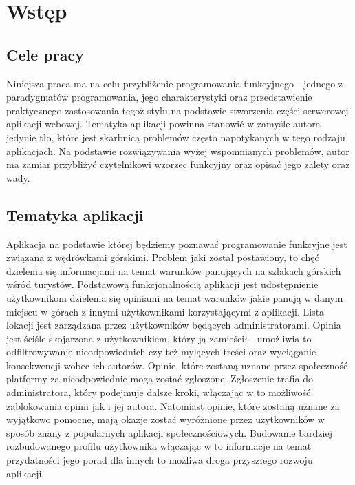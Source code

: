 \documentclass[../main.tex]{subfiles}
\begin{document}
\section{Wstęp}
\subsection{Cele pracy}

Niniejsza praca ma na celu przybliżenie programowania funkcyjnego - jednego z paradygmatów programowania, jego charakterystyki oraz przedstawienie praktycznego zastosowania tegoż stylu na podstawie stworzenia części serwerowej aplikacji webowej. Tematyka aplikacji powinna stanowić w zamyśle autora jedynie tło, które jest skarbnicą problemów często napotykanych w tego rodzaju aplikacjach. Na podstawie rozwiązywania wyżej wspomnianych problemów, autor ma zamiar przybliżyć czytelnikowi wzorzec funkcyjny oraz opisać jego zalety oraz wady.

\subsection{Tematyka aplikacji}
Aplikacja na podstawie której będziemy poznawać programowanie funkcyjne jest związana z wędrówkami górskimi. Problem jaki został postawiony, to chęć dzielenia się informacjami na temat warunków panujących na szlakach górskich wśród turystów. 
Podstawową funkcjonalnością aplikacji jest udostępnienie użytkownikom dzielenia się opiniami na temat warunków jakie panują w danym miejscu w górach z innymi użytkownikami korzystającymi z aplikacji. Lista lokacji jest zarządzana przez użytkowników będących administratorami.\newline
Opinia jest ściśle skojarzona z użytkownikiem, który ją zamieścił - umożliwia to odfiltrowywanie nieodpowiednich czy też mylących treści oraz wyciąganie konsekwencji wobec ich autorów.\newline
Opinie, które zostaną uznane przez społeczność platformy za nieodpowiednie mogą zostać zgłoszone. Zgłoszenie trafia do administratora, który podejmuje dalsze kroki, włączając w to możliwość zablokowania opinii jak i jej autora.\newline
Natomiast opinie, które zostaną uznane za wyjątkowo pomocne, mają okazje zostać wyróżnione przez użytkowników w sposób znany z popularnych aplikacji społecznościowych. Budowanie bardziej rozbudowanego profilu użytkownika włączając w to informacje na temat przydatności jego porad dla innych to możliwa droga przyszłego rozwoju aplikacji.
\end{document}
